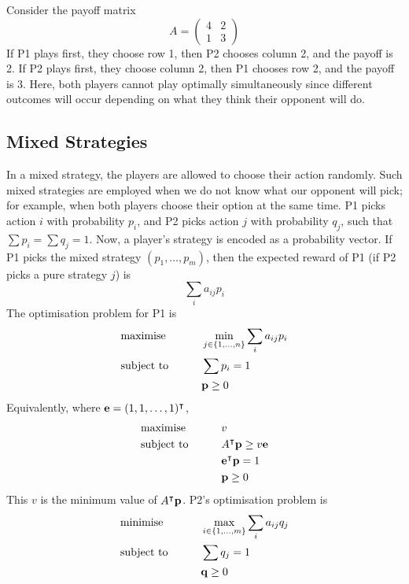 \begin{example}
	Consider the payoff matrix
	\[
		A = \begin{pmatrix}
			4 & 2 \\ 1 & 3
		\end{pmatrix}
	\]
	If P1 plays first, they choose row 1, then P2 chooses column 2, and the payoff is 2.
	If P2 plays first, they choose column 2, then P1 chooses row 2, and the payoff is 3.
	Here, both players cannot play optimally simultaneously since different outcomes will occur depending on what they think their opponent will do.
\end{example}

\subsection{Mixed Strategies}
In a mixed strategy, the players are allowed to choose their action randomly.
Such mixed strategies are employed when we do not know what our opponent will pick; for example, when both players choose their option at the same time.
P1 picks action \( i \) with probability \( p_i \), and P2 picks action \( j \) with probability \( q_j \), such that \( \sum p_i = \sum q_j = 1 \).
Now, a player's strategy is encoded as a probability vector.
If P1 picks the mixed strategy \( (p_1, \dots, p_m) \), then the expected reward of P1 (if P2 picks a pure strategy \( j \)) is
\[
	\sum_i a_{ij} p_i
\]
The optimisation problem for P1 is
\begin{alignat*}{2}
	 & \text{maximise}   & \qquad & \min_{j \in \qty{1,\dots,n}} \sum_i a_{ij} p_i \\
	 & \text{subject to} &        & \sum p_i = 1                                   \\
	 &                   &        & \vb p \geq 0
\end{alignat*}
Equivalently, where \( \vb e = (1,1,\dots,1)^\intercal \),
\begin{alignat*}{2}
	 & \text{maximise}   & \qquad & v                               \\
	 & \text{subject to} &        & A^\intercal \vb p \geq v \vb e \\
	 &                   &        & \vb e^\intercal \vb p = 1      \\
	 &                   &        & \vb p \geq 0
\end{alignat*}
This \( v \) is the minimum value of \( A^\intercal \vb p \).
P2's optimisation problem is
\begin{alignat*}{2}
	 & \text{minimise}   & \qquad & \max_{i \in \qty{1,\dots,m}} \sum_i a_{ij} q_j \\
	 & \text{subject to} &        & \sum q_j = 1                                   \\
	 &                   &        & \vb q \geq 0
\end{alignat*}
